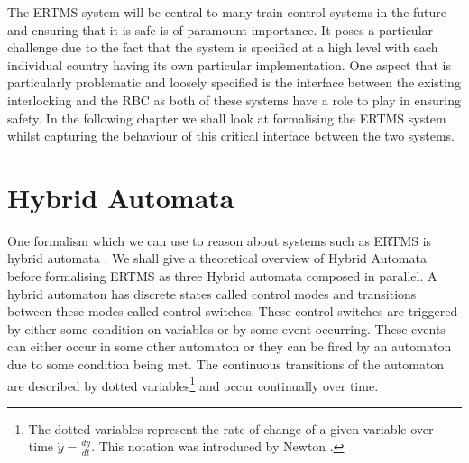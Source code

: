 

The ERTMS system will be central to many train control systems in the future and ensuring that it is safe is of paramount importance. It poses a particular challenge due to the fact that the system is specified at a high level with each individual country having its own particular implementation. One aspect that is particularly problematic and loosely specified is the interface between the existing interlocking and the RBC as both of these systems have a role to play in ensuring safety. In the following chapter we shall look at formalising the ERTMS system whilst capturing the behaviour of this critical interface between the two systems. 


\section{Hybrid Automata}

One formalism which we can use to reason about systems such as ERTMS is hybrid automata \cite{TH96}. We shall give a theoretical overview of Hybrid Automata before formalising ERTMS as three Hybrid automata composed in parallel. A hybrid automaton has discrete states called control modes and transitions between these modes called control switches. These control switches are triggered by either some condition on variables or by some event occurring. These events can either occur in some other automaton or they can be fired by an automaton due to some condition being met. The continuous transitions of the automaton are described by dotted variables\footnote{The dotted variables represent the rate of change of a given variable over time $\dot{y} = \frac{dy}{dt}$. This notation was introduced by Newton \cite{CF28}.} and occur continually over time.

